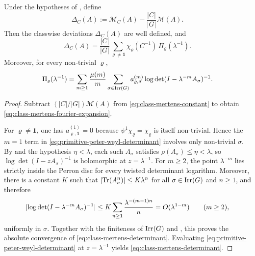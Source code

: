 \begin{proposition}
  \label{prop:class-mertens-deviations}
  Under the hypotheses of , define
  \[
    \Delta_C(A)
    :=\mathcal M_C(A)-\frac{|C|}{|G|}\mathcal M(A).
  \]
  Then the classwise deviations \(\Delta_C(A)\) are well defined, and
  \begin{equation}\label{eq:class-mertens-fourier-expansion}
    \Delta_C(A)
    =
    \frac{|C|}{|G|}
      \sum_{\varrho\neq\mathbf 1}
        \chi_\varrho(C^{-1})\,\Pi_\varrho(\lambda^{-1}).
  \end{equation}
  Moreover, for every non-trivial \(\varrho\),
  \begin{equation}\label{eq:class-mertens-determinant}
    \Pi_\varrho(\lambda^{-1})
    =
    \sum_{m\ge 1}\frac{\mu(m)}{m}
      \sum_{\sigma\in\operatorname{Irr}(G)}
        a_{\varrho,\sigma}^{(m)}
        \log\det(I-\lambda^{-m}A_\sigma)^{-1}.
  \end{equation}
\end{proposition}

\begin{proof}
  Subtract \((|C|/|G|)\mathcal M(A)\) from
  \eqref{eq:class-mertens-constant} to obtain
  \eqref{eq:class-mertens-fourier-expansion}.

  For \(\varrho\neq\mathbf 1\), one has
  \(a_{\varrho,\mathbf 1}^{(1)}=0\) because
  \(\psi^1\chi_\varrho=\chi_\varrho\) is itself non-trivial. Hence the
  \(m=1\) term in \eqref{eq:primitive-peter-weyl-determinant} involves
  only non-trivial \(\sigma\). By
   and the hypothesis
  \(\eta<\lambda\), each such \(A_\sigma\) satisfies
  \(\rho(A_\sigma)\le \eta<\lambda\), so
  \(\log\det(I-zA_\sigma)^{-1}\) is holomorphic at \(z=\lambda^{-1}\).
  For \(m\ge 2\), the point \(\lambda^{-m}\) lies strictly inside the
  Perron disc for every twisted determinant logarithm. Moreover, there
  is a constant \(K\) such that
  \(\lvert \operatorname{Tr}(A_\sigma^n) \rvert\le K\lambda^n\) for all
  \(\sigma\in\operatorname{Irr}(G)\) and \(n\ge 1\), and therefore
  \[
    \lvert \log\det(I-\lambda^{-m}A_\sigma)^{-1} \rvert
    \le
    K\sum_{n\ge 1}\frac{\lambda^{-(m-1)n}}{n}
    =O(\lambda^{1-m})
    \qquad (m\ge 2),
  \]
  uniformly in \(\sigma\). Together with the finiteness of \(\operatorname{Irr}(G)\)
  and , this proves the absolute
  convergence of \eqref{eq:class-mertens-determinant}. Evaluating
  \eqref{eq:primitive-peter-weyl-determinant} at \(z=\lambda^{-1}\)
  yields \eqref{eq:class-mertens-determinant}.
\end{proof}

